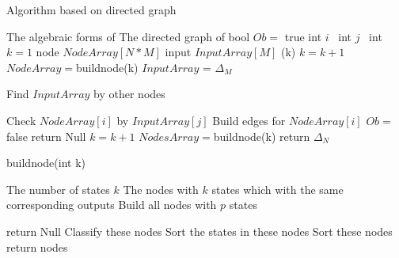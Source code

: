 \begin{algorithm}[h]
\caption{Algorithm based on directed graph}
\begin{algorithmic}[1]
\REQUIRE 
The algebraic forms of \BCN
\ENSURE  
The directed graph of \BCN
\STATE bool $Ob=$ true %
\STATE int $i$ \
\STATE int $j$ \
\STATE int $k=1$ %
\STATE node $NodeArray[N*M]$
\STATE input $InputArray[M]$
\STATE {\sf buildnode}(k)
\STATE $k= k+1$
\STATE $NodeArray=${\sf buildnode}(k)
\IF{($k==2$)}
\STATE $InputArray$ = $\Delta_M$ 
\ELSE

\STATE Find $InputArray$ by other nodes

\ENDIF
\STATE Check $NodeArray[i]$ by $InputArray[j]$ 
\STATE Build edges for $NodeArray[i]$ 
\ENDFOR
{}
\STATE  $Ob=$ false 
\STATE return Null
\ENDIF
\ENDFOR
\STATE $k= k+1$
\STATE $NodesArray=${\sf buildnode}(k)
\ENDWHILE
\STATE return $\Delta_N$\
\end{algorithmic}
 \label{alg:1}
\end{algorithm}
\begin{algorithm}[h!]
\caption{{\sf buildnode}(int k)}
\begin{algorithmic}[1]
\REQUIRE 
The number of states $k$
\ENSURE  
The nodes with $k$ states which with the same corresponding outputs %
\STATE  Build all nodes with $p$ states %

\STATE  return Null
\ELSE 
\STATE  Classify these nodes
\STATE Sort the states in these nodes
\STATE Sort these nodes%
\STATE return nodes
\ENDIF 
\end{algorithmic}
 \label{alg:2}
\end{algorithm}

